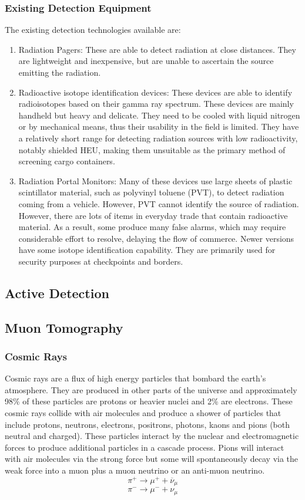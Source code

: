 \documentclass[twoside,titlepage,11pt,twocolumn,a4paper]{article}
\begin{document}
\subsubsection{Existing Detection Equipment}
The existing detection technologies available are:
\begin{enumerate}
\item Radiation Pagers: These are able to detect radiation at close
  distances. They are lightweight and inexpensive, but are unable to
  ascertain the source emitting the radiation. \citep{medalia2007}
\item Radioactive isotope identification devices: These devices are
  able to identify radioisotopes based on their gamma ray
  spectrum. These devices are mainly handheld but heavy and
  delicate. They need to be cooled with liquid nitrogen or by
  mechanical means, thus their usability in the field is limited. They
  have a relatively short range for detecting radiation sources with
  low radioactivity, notably shielded HEU, making them unsuitable as
  the primary method of screening cargo
  containers. \citep{medalia2007}
\item Radiation Portal Monitors: Many of these devices use large
  sheets of plastic scintillator material, such as polyvinyl toluene
  (PVT), to detect radiation coming from a vehicle.  However, PVT
  cannot identify the source of radiation. However, there are lots of
  items in everyday trade that contain radioactive material. As a
  result, some produce many false alarms, which may require
  considerable effort to resolve, delaying the flow of commerce.
  Newer versions have some isotope identification
  capability. \citep{medalia2007} They are primarily used for security
  purposes at checkpoints and borders. \citep{nuclearMatDet}
\end{enumerate}

\subsection{Active Detection}

\subsection{Muon Tomography}
\subsubsection{Cosmic Rays}
Cosmic rays are a flux of high energy particles that bombard the
earth’s atmosphere. They are produced in other parts of the universe
and approximately 98\% of these particles are protons or heavier
nuclei and 2\% are electrons. These cosmic rays collide with air
molecules and produce a shower of particles that include protons,
neutrons, electrons, positrons, photons, kaons and pions (both neutral
and charged). These particles interact by the nuclear and
electromagnetic forces to produce additional particles in a cascade
process. Pions will interact with air molecules via the strong force
but some will spontaneously decay via the weak force into a muon plus
a muon neutrino or an anti-muon neutrino. \citep{muonManual2005}
\[ \pi^+ \rightarrow \mu^+ + \overline{\nu}_\mu \]
\[ \pi^- \rightarrow \mu^- + \nu_\mu \]
\end{document}
